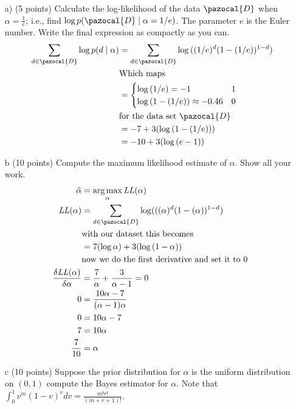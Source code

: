 \documentclass[a4 paper]{article}
\DeclareMathOperator*{\argmax}{arg\,max}
\begin{document}
	\begin{enumerate}
	\item[a) (5 points)] Calculate the log-likelihood of the data $\pazocal{D}$ when $\alpha = \frac{1}{e}$; i.e., find $\log{p(\pazocal{D} \mid \alpha = 1/e)}$. The parameter $e$ is the Euler number. Write the final expression as compactly as you can.
	\begin{equation*}	
	\begin{split}\
	 \sum_{d \in \pazocal{D}} \log{p(d \mid \alpha)} & = \sum_{d \in \pazocal{D}}\log{((1/e)^d(1-(1/e))^{1-d})} \\
	 & \text{Which maps} \\
	 & = \begin{cases}
	 \log{(1/e)} = -1 & 1 \\ 
	 \log{(1-(1/e))} \approx  -0.46 & 0
	 \end{cases} \\
	 & \text{for the data set } \pazocal{D} \\
	 & = -7 + 3(\log{(1-(1/e))}) \\
	 & = -10 + 3(\log{(e-1)})
	\end{split}	
	\end{equation*}
	\item[b (10 points)] Compute the maximum likelihood estimate of $\alpha$. Show all your work. 
	\begin{equation*}
	\begin{split}
	\hat{\alpha} & = \argmax_{\alpha}{\mathit{LL}(\alpha)}\\ 
	\mathit{LL}(\alpha)  &= \sum_{d \in \pazocal{D}} \log(((\alpha)^d(1-(\alpha))^{1-d}) \\
	& \text{with our dataset this becomes} \\
	& = 7(\log{\alpha}) + 3(\log{(1-\alpha})) \\
	& \text{now we do the first derivative and set it to 0} \\
	\frac{\delta\mathit{LL(\alpha)}}{\delta\alpha} & = \frac{7}{\alpha} + \frac{3}{\alpha -1} = 0  \\ 
	0 & = \frac{10 \alpha - 7}{(\alpha - 1)\alpha} \\
	0 & = 10\alpha - 7 \\
	7 & = 10\alpha  \\
	\frac{7}{10} & = \alpha 
	\end{split}
	\end{equation*}
	\item[c (10 points)] Suppose the prior distribution for $\alpha$ is the uniform distribution on $(0, 1)$ compute the Bayes estimator for $\alpha$. Note that $\int_0^1 v^m(1-v)^rdv = \frac{m!r!}{(m+r+1)!}$.

\end{enumerate}
\end{document}

